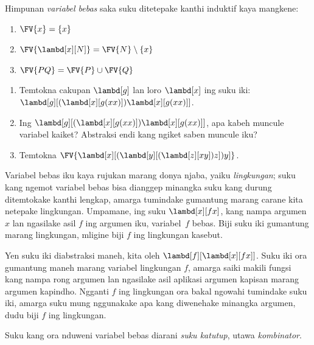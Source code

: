 \documentclass[../../../include/open-logic-section]{subfiles}
\begin{document}
\begin{defn} 
  Himpunan \emph{variabel bebas}
  saka suku ditetepake kanthi
  induktif kaya mangkene:
  \begin{enumerate}
    \item $\FV{x} = \{x\}$ 
    \item $\FV{\lambd[x][N]} = \FV{N} \setminus \{x\}$ 
    \item $\FV{PQ} = \FV{P} \cup \FV{Q}$ 
  \end{enumerate}
\end{defn}

\begin{prob}
  \begin{enumerate}
  \item Temtokna cakupan $\lambd[g]$
    lan loro $\lambd[x]$ ing suku
    iki: $\lambd[g][(\lambd[x][g (x x)]) \lambd[x][g (x x)]]$.
  \item Ing $\lambd[g][(\lambd[x][g (x x)]) \lambd[x][g (x x)]]$,
    apa kabeh muncule variabel kaiket?
    Abstraksi endi kang ngiket
    saben muncule iku?
  \item Temtokna
    $\FV{\lambd[x][(\lambd[y][(\lambd[z][x y]) z]) y]}$.
  \end{enumerate}
\end{prob}

\begin{explain}
Variabel bebas iku kaya rujukan
marang donya njaba, yaiku
\emph{lingkungan}; suku kang
ngemot variabel bebas bisa
dianggep minangka suku kang
durung ditemtokake kanthi
lengkap, amarga tumindake
gumantung marang carane kita
netepake lingkungan. Umpamane,
ing suku $\lambd[x][f x]$,
kang nampa argumen~$x$ lan
ngasilake asil $f$ ing argumen
iku, variabel~$f$ bebas.
Biji suku iki gumantung marang
lingkungan, mligine biji $f$
ing lingkungan kasebut.

Yen suku iki diabstraksi maneh,
kita oleh $\lambd[f][\lambd[x][f
    x]]$. Suku iki ora gumantung
maneh marang variabel lingkungan
$f$, amarga saiki makili fungsi
kang nampa rong argumen lan
ngasilake asil aplikasi argumen
kapisan marang argumen kapindho.
Ngganti $f$ ing lingkungan
ora bakal ngowahi tumindake
suku iki, amarga suku mung
nggunakake apa kang diwenehake
minangka argumen, dudu biji
$f$ ing lingkungan.
\end{explain}

\begin{defn}
  Suku kang ora nduweni
  variabel bebas diarani
  \emph{suku katutup}, utawa
  \emph{kombinator}.
\end{defn}
\end{document}
